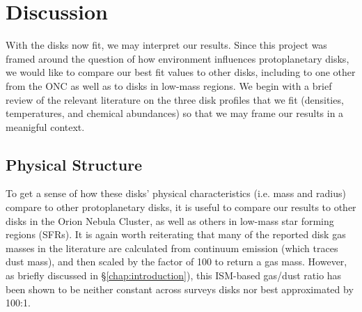 \chapter{Discussion}
\label{chap:discussion}



With the disks now fit, we may interpret our results. Since this project was framed around the question of how environment influences protoplanetary disks, we would like to compare our best fit values to other disks, including to one other from the ONC \citep{Factor2017} as well as to disks in low-mass regions. We begin with a brief review of the relevant literature on the three disk profiles that we fit (densities, temperatures, and chemical abundances) so that we may frame our results in a meanigful context.







\section{Physical Structure}





To get a sense of how these disks' physical characteristics (i.e. mass and radius) compare to other protoplanetary disks, it is useful to compare our results to other disks in the Orion Nebula Cluster, as well as others in low-mass star forming regions (SFRs). It is again worth reiterating that many of the reported disk gas masses in the literature \citep[as well as the values we use here from][]{Williams2014} are calculated from continuum emission (which traces dust mass), and then scaled by the factor of 100 to return a gas mass. However, as briefly discussed in \S\ref{chap:introduction}), this ISM-based gas/dust ratio has been shown to be neither constant across surveys disks nor best approximated by 100:1.


